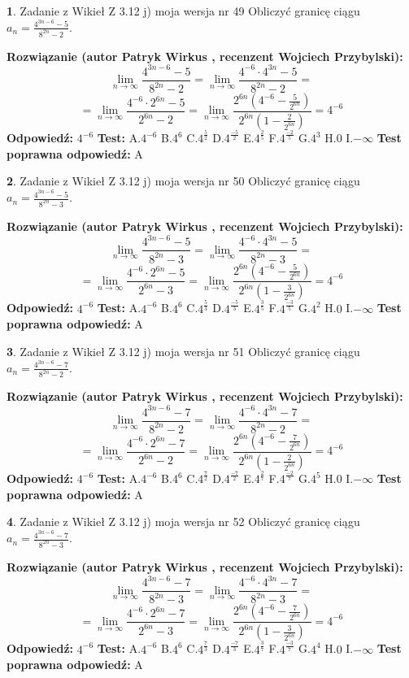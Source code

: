 \documentclass[12pt, a4paper]{article}
\theoremstyle{definition} %
\newtheorem{zad}{}
\newcommand{\zadStart}[1]{\begin{zad}#1\newline}
\newcommand{\zadStop}{\end{zad}}
\newcommand{\rozwStart}[2]{\noindent \textbf{Rozwiązanie (autor #1 , recenzent #2): }\newline}
\newcommand{\rozwStop}{\newline}
\newcommand{\odpStart}{\noindent \textbf{Odpowiedź:}\newline}
\newcommand{\odpStop}{\newline}
\newcommand{\testStart}{\noindent \textbf{Test:}\newline}
\newcommand{\testStop}{\newline}
\newcommand{\kluczStart}{\noindent \textbf{Test poprawna odpowiedź:}\newline}
\newcommand{\kluczStop}{\newline}
\begin{document}
\zadStart{Zadanie z Wikieł Z 3.12 j) moja wersja nr 49}
Obliczyć granicę ciągu $a_{n}=\frac{4^{3n-6}-5}{8^{2n}-2}$.
\zadStop
\rozwStart{Patryk Wirkus}{Wojciech Przybylski}
$$\lim\limits_{n\to\infty}\frac{4^{3n-6}-5}{8^{2n}-2}= \lim\limits_{n\to\infty}\frac{4^{-6} \cdot 4^{3n}-5}{8^{2n}-2}=$$
$$= \lim\limits_{n\to\infty}\frac{4^{-6} \cdot 2^{6n}-5}{2^{6n}-2}= \lim\limits_{n\to\infty}\frac{2^{6n}(4^{-6} - \frac{5}{2^{6n}})}{2^{6n}(1-\frac{2}{2^{6n}})}= 4^{-6}$$
\rozwStop
\odpStart
$4^{-6}$
\odpStop
\testStart
A.$4^{-6}$
B.$4^{6}$
C.$4^{\frac{5}{2}}$
D.$4^{\frac{-5}{2}}$
E.$4^{\frac{2}{5}}$
F.$4^{\frac{-2}{5}}$
G.$4^{3}$
H.$0$
I.$-\infty$
\testStop
\kluczStart
A
\kluczStop



\zadStart{Zadanie z Wikieł Z 3.12 j) moja wersja nr 50}
Obliczyć granicę ciągu $a_{n}=\frac{4^{3n-6}-5}{8^{2n}-3}$.
\zadStop
\rozwStart{Patryk Wirkus}{Wojciech Przybylski}
$$\lim\limits_{n\to\infty}\frac{4^{3n-6}-5}{8^{2n}-3}= \lim\limits_{n\to\infty}\frac{4^{-6} \cdot 4^{3n}-5}{8^{2n}-3}=$$
$$= \lim\limits_{n\to\infty}\frac{4^{-6} \cdot 2^{6n}-5}{2^{6n}-3}= \lim\limits_{n\to\infty}\frac{2^{6n}(4^{-6} - \frac{5}{2^{6n}})}{2^{6n}(1-\frac{3}{2^{6n}})}= 4^{-6}$$
\rozwStop
\odpStart
$4^{-6}$
\odpStop
\testStart
A.$4^{-6}$
B.$4^{6}$
C.$4^{\frac{5}{3}}$
D.$4^{\frac{-5}{3}}$
E.$4^{\frac{3}{5}}$
F.$4^{\frac{-3}{5}}$
G.$4^{2}$
H.$0$
I.$-\infty$
\testStop
\kluczStart
A
\kluczStop



\zadStart{Zadanie z Wikieł Z 3.12 j) moja wersja nr 51}
Obliczyć granicę ciągu $a_{n}=\frac{4^{3n-6}-7}{8^{2n}-2}$.
\zadStop
\rozwStart{Patryk Wirkus}{Wojciech Przybylski}
$$\lim\limits_{n\to\infty}\frac{4^{3n-6}-7}{8^{2n}-2}= \lim\limits_{n\to\infty}\frac{4^{-6} \cdot 4^{3n}-7}{8^{2n}-2}=$$
$$= \lim\limits_{n\to\infty}\frac{4^{-6} \cdot 2^{6n}-7}{2^{6n}-2}= \lim\limits_{n\to\infty}\frac{2^{6n}(4^{-6} - \frac{7}{2^{6n}})}{2^{6n}(1-\frac{2}{2^{6n}})}= 4^{-6}$$
\rozwStop
\odpStart
$4^{-6}$
\odpStop
\testStart
A.$4^{-6}$
B.$4^{6}$
C.$4^{\frac{7}{2}}$
D.$4^{\frac{-7}{2}}$
E.$4^{\frac{2}{7}}$
F.$4^{\frac{-2}{7}}$
G.$4^{5}$
H.$0$
I.$-\infty$
\testStop
\kluczStart
A
\kluczStop



\zadStart{Zadanie z Wikieł Z 3.12 j) moja wersja nr 52}
Obliczyć granicę ciągu $a_{n}=\frac{4^{3n-6}-7}{8^{2n}-3}$.
\zadStop
\rozwStart{Patryk Wirkus}{Wojciech Przybylski}
$$\lim\limits_{n\to\infty}\frac{4^{3n-6}-7}{8^{2n}-3}= \lim\limits_{n\to\infty}\frac{4^{-6} \cdot 4^{3n}-7}{8^{2n}-3}=$$
$$= \lim\limits_{n\to\infty}\frac{4^{-6} \cdot 2^{6n}-7}{2^{6n}-3}= \lim\limits_{n\to\infty}\frac{2^{6n}(4^{-6} - \frac{7}{2^{6n}})}{2^{6n}(1-\frac{3}{2^{6n}})}= 4^{-6}$$
\rozwStop
\odpStart
$4^{-6}$
\odpStop
\testStart
A.$4^{-6}$
B.$4^{6}$
C.$4^{\frac{7}{3}}$
D.$4^{\frac{-7}{3}}$
E.$4^{\frac{3}{7}}$
F.$4^{\frac{-3}{7}}$
G.$4^{4}$
H.$0$
I.$-\infty$
\testStop
\kluczStart
A
\kluczStop
\end{document}
